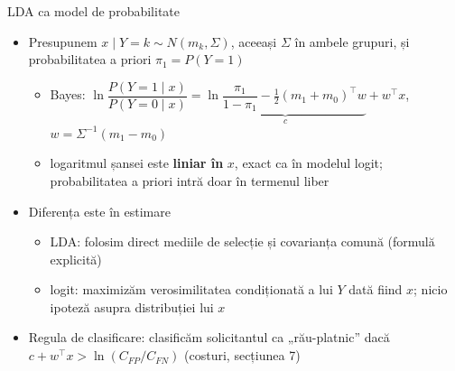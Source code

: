 \begin{frame}{LDA ca model de probabilitate}
\itemsize{\footnotesize}
\begin{itemize}
    \item Presupunem $x \mid Y = k \sim N(m_k, \Sigma)$, aceeași $\Sigma$ în ambele grupuri, și probabilitatea a priori $\pi_1 = P(Y = 1)$
    \begin{itemize}
        \item Bayes: $\ln\dfrac{P(Y = 1 \mid x)}{P(Y = 0 \mid x)} = \underbrace{\ln\dfrac{\pi_1}{1 - \pi_1} - \tfrac12(m_1 + m_0)^\top w}_{c} + w^\top x$, \quad $w = \Sigma^{-1}(m_1 - m_0)$
        \item logaritmul șansei este \textbf{liniar în} $x$, exact ca în modelul logit; probabilitatea a priori intră doar în termenul liber
    \end{itemize}
    \item Diferența este în estimare
    \begin{itemize}
        \item LDA: folosim direct mediile de selecție și covarianța comună (formulă explicită)
        \item logit: maximizăm verosimilitatea condiționată a lui $Y$ dată fiind $x$; nicio ipoteză asupra distribuției lui $x$
    \end{itemize}
    \item Regula de clasificare: clasificăm solicitantul ca „rău-platnic” dacă $c + w^\top x > \ln(C_{FP}/C_{FN})$ (costuri, secțiunea 7)
\end{itemize}
\end{frame}


